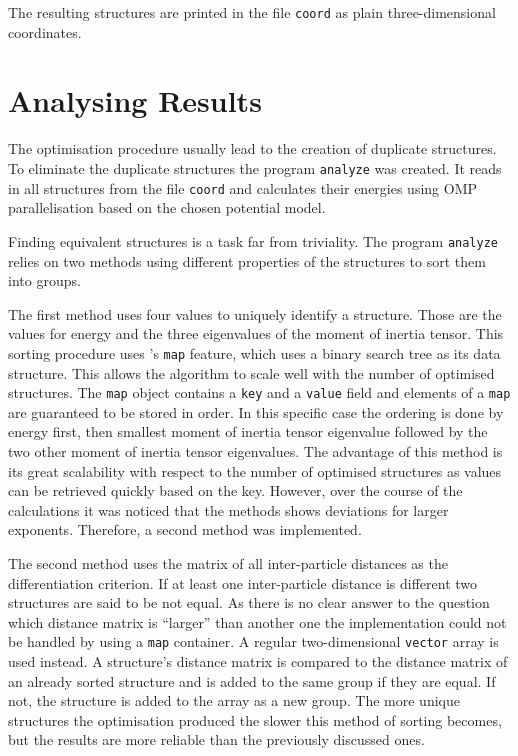 The resulting structures are printed in the file \verb|coord| as plain
three-dimensional coordinates.

\section{Analysing Results}
\label{sec:analysingresults}

The optimisation procedure usually lead to the creation of duplicate
structures. To eliminate the duplicate structures the program \verb|analyze|
was created. It reads in all structures from the file \verb|coord| and
calculates their energies using \ac{OMP} parallelisation based on the chosen
potential model.

Finding equivalent structures is a task far from triviality. The program
\verb|analyze| relies on two methods using different properties of the
structures to sort them into groups.

The first method uses four values to uniquely identify a structure. Those are
the values for energy and the three eigenvalues of the moment of inertia
tensor. This sorting procedure uses \Cpp's \verb|map| feature, which uses a
binary search tree as its data structure. This allows the algorithm to scale
well with the number of optimised structures. The \Cpp \verb|map| object
contains a \verb|key| and a \verb|value| field and elements of a \verb|map| are
guaranteed to be stored in order.\autocite{Stroustrup_programminglanguage_2000}
In this specific case the ordering is done by energy first, then smallest
moment of inertia tensor eigenvalue followed by the two other moment of inertia
tensor eigenvalues. The advantage of this method is its great scalability with
respect to the number of optimised structures as values can be retrieved
quickly based on the key.  However, over the course of the calculations it was
noticed that the methods shows deviations for larger exponents. Therefore, a
second method was implemented.

The second method uses the matrix of all inter-particle distances as the
differentiation criterion. If at least one inter-particle distance is different
two structures are said to be not equal. As there is no clear answer to the
question which distance matrix is ``larger'' than another one the
implementation could not be handled by using a \verb|map| container. A regular
two-dimensional \verb|vector| array is used instead. A structure's distance
matrix is compared to the distance matrix of an already sorted structure and is
added to the same group if they are equal. If not, the structure is added to
the array as a new group. The more unique structures the optimisation produced
the slower this method of sorting becomes, but the results are more reliable
than the previously discussed ones.

